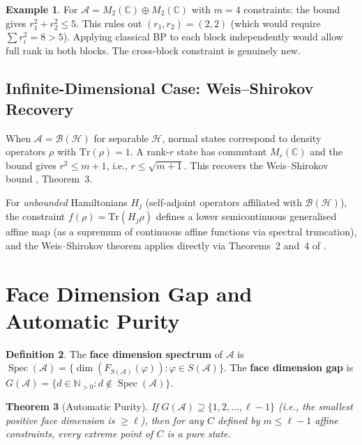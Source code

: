 \documentclass[11pt,a4paper]{article}
\theoremstyle{plain}
\newtheorem{theorem}{Theorem}[section]
\theoremstyle{definition}
\newtheorem{definition}[theorem]{Definition}
\newtheorem{example}[theorem]{Example}
\theoremstyle{remark}
\newcommand{\N}{\mathbb{N}}
\newcommand{\C}{\mathbb{C}}
\newcommand{\Hilbert}{\mathcal{H}}
\newcommand{\BH}{\mathcal{B}(\Hilbert)}
\newcommand{\tr}{\mathrm{Tr}}
\DeclareMathOperator{\Spec}{Spec}
\begin{document}
\begin{example}
For $\mathcal{A} = M_2(\C) \oplus M_2(\C)$ with $m = 4$ constraints:
the bound gives $r_1^2 + r_2^2 \le 5$. This rules out
$(r_1, r_2) = (2, 2)$ (which would require $\sum r_i^2 = 8 > 5$).
Applying classical BP to each block independently would allow full rank
in both blocks. The cross-block constraint is genuinely new.
\end{example}

\subsection{Infinite-Dimensional Case: Weis--Shirokov Recovery}
\label{sec:weis-shirokov-recovery}

When $\mathcal{A} = \BH$ for separable $\Hilbert$, normal states
correspond to density operators $\rho$ with $\tr(\rho) = 1$.
A rank-$r$ state has commutant $M_r(\C)$ and the bound gives
$r^2 \le m + 1$, i.e., $r \le \sqrt{m + 1}$.
This recovers the Weis--Shirokov bound \cite{weisshirokov2021}, Theorem~3.

For \emph{unbounded} Hamiltonians $H_j$ (self-adjoint operators affiliated
with $\BH$), the constraint $f(\rho) = \tr(H_j\rho)$ defines a lower
semicontinuous generalised affine map (as a supremum of continuous affine
functions via spectral truncation), and the Weis--Shirokov theorem
applies directly via Theorems~2 and~4 of \cite{weisshirokov2021}.


\section{Face Dimension Gap and Automatic Purity}
\label{sec:face-gap}

\begin{definition}
The \textbf{face dimension spectrum} of $\mathcal{A}$ is
$\Spec(\mathcal{A}) = \{\dim(F_{S(\mathcal{A})}(\varphi)) :
\varphi \in S(\mathcal{A})\}$.
The \textbf{face dimension gap} is
$G(\mathcal{A}) = \{d \in \N_{>0} : d \notin \Spec(\mathcal{A})\}$.
\end{definition}

\begin{theorem}[Automatic Purity]
\label{thm:automatic-purity}
If $G(\mathcal{A}) \supseteq \{1, 2, \ldots, \ell - 1\}$ (i.e., the
smallest positive face dimension is $\ge \ell$), then for any $C$ defined
by $m \le \ell - 1$ affine constraints, every extreme point of $C$ is a
\emph{pure state}.
\end{theorem}
\end{document}

